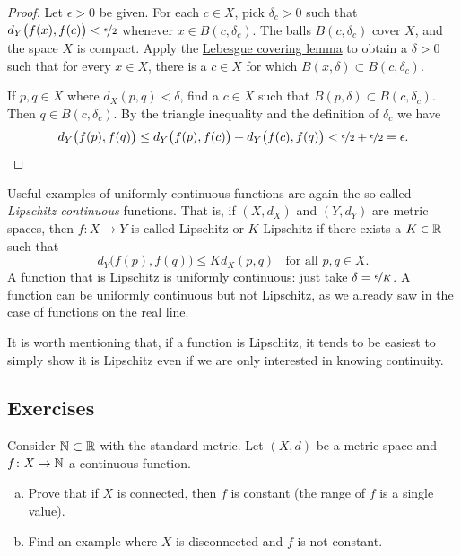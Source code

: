 \begin{proof}
Let $\epsilon > 0$ be given.  For each $c \in X$, pick $\delta_c > 0$ such that
$d_Y\bigl(f(x),f(c)\bigr) < \nicefrac{\epsilon}{2}$
whenever
$x \in B(c,\delta_c)$.
The balls
$B(c,\delta_c)$ cover $X$, and the space $X$ is compact.  
Apply the \hyperref[ms:lebesgue]{Lebesgue covering lemma} to obtain a 
$\delta > 0$ such that for every $x \in X$, there is a $c \in X$
for which $B(x,\delta) \subset B(c,\delta_c)$.

If $p, q \in X$ where $d_X(p,q) < \delta$,
find a $c \in X$ such that $B(p,\delta) \subset B(c,\delta_c)$.
Then $q \in B(c,\delta_c)$.  By the triangle inequality
and the definition of $\delta_c$ we have
\begin{equation*}
d_Y\bigl(f(p),f(q)\bigr)
\leq
d_Y\bigl(f(p),f(c)\bigr)
+
d_Y\bigl(f(c),f(q)\bigr)
<
\nicefrac{\epsilon}{2}+
\nicefrac{\epsilon}{2} = \epsilon .  \qedhere
\end{equation*}
\end{proof}

\begin{example}
Useful examples of uniformly continuous functions are again the so-called
\emph{Lipschitz continuous}%
%
functions.  That is, if
$(X,d_X)$ and $(Y,d_Y)$ are metric spaces, then $f \colon X \to Y$
is called Lipschitz or $K$-Lipschitz if there exists a $K \in {\mathbb{R}}$ such that
\begin{equation*}
d_Y\bigl(f(p),f(q)\bigr) \leq K d_X(p,q)
\ \ \ \ \text{for all } p,q \in X.
\end{equation*}
A function that is Lipschitz is uniformly continuous:
just take $\delta = \nicefrac{\epsilon}{K}$.
A function can be uniformly continuous
but not Lipschitz,
as we already saw in the case
of functions on the real line.

It is worth mentioning that,
if a function is Lipschitz, it tends to be
easiest to simply show it is Lipschitz even if we are only
interested in knowing continuity.
\end{example}

\subsection{Exercises}

\begin{exercise}
Consider ${\mathbb{N}} \subset {\mathbb{R}}$ with the standard metric.  Let $(X,d)$ be a
metric space and $f \colon X \to {\mathbb{N}}$ a continuous function.
\begin{enumerate}[a)]
\item
Prove that if $X$ is connected,
then $f$ is constant (the range of $f$ is a single value).
\item
Find an example where $X$ is disconnected and $f$ is not constant.
\end{enumerate}
\end{exercise}

